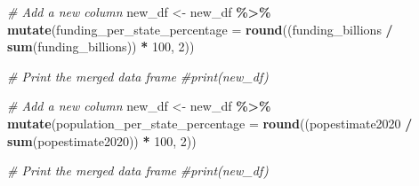 \documentclass[
]{article}
\newenvironment{Shaded}{\begin{snugshade}}{\end{snugshade}}
\newcommand{\AttributeTok}[1]{\textcolor[rgb]{0.13,0.29,0.53}{#1}}
\newcommand{\CommentTok}[1]{\textcolor[rgb]{0.56,0.35,0.01}{\textit{#1}}}
\newcommand{\DecValTok}[1]{\textcolor[rgb]{0.00,0.00,0.81}{#1}}
\newcommand{\FunctionTok}[1]{\textcolor[rgb]{0.13,0.29,0.53}{\textbf{#1}}}
\newcommand{\NormalTok}[1]{#1}
\newcommand{\OtherTok}[1]{\textcolor[rgb]{0.56,0.35,0.01}{#1}}
\newcommand{\SpecialCharTok}[1]{\textcolor[rgb]{0.81,0.36,0.00}{\textbf{#1}}}
\begin{document}
\begin{Shaded}
\begin{Highlighting}[]
\CommentTok{\# Add a new column}
\NormalTok{new\_df }\OtherTok{\textless{}{-}}\NormalTok{ new\_df }\SpecialCharTok{\%\textgreater{}\%}
  \FunctionTok{mutate}\NormalTok{(}\AttributeTok{funding\_per\_state\_percentage =} \FunctionTok{round}\NormalTok{((funding\_billions }\SpecialCharTok{/} \FunctionTok{sum}\NormalTok{(funding\_billions)) }\SpecialCharTok{*} \DecValTok{100}\NormalTok{, }\DecValTok{2}\NormalTok{))}

\CommentTok{\# Print the merged data frame}
\CommentTok{\#print(new\_df)}
\end{Highlighting}
\end{Shaded}

\begin{Shaded}
\begin{Highlighting}[]
\CommentTok{\# Add a new column}
\NormalTok{new\_df }\OtherTok{\textless{}{-}}\NormalTok{ new\_df }\SpecialCharTok{\%\textgreater{}\%}
  \FunctionTok{mutate}\NormalTok{(}\AttributeTok{population\_per\_state\_percentage =} \FunctionTok{round}\NormalTok{((popestimate2020 }\SpecialCharTok{/} \FunctionTok{sum}\NormalTok{(popestimate2020)) }\SpecialCharTok{*} \DecValTok{100}\NormalTok{, }\DecValTok{2}\NormalTok{))}

\CommentTok{\# Print the merged data frame}
\CommentTok{\#print(new\_df)}
\end{Highlighting}
\end{Shaded}
\end{document}
